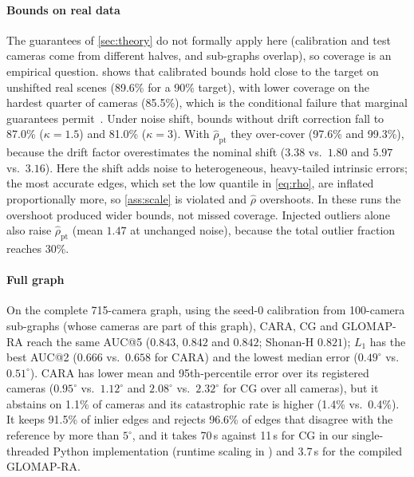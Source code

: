 

\paragraph*{Bounds on real data} The guarantees of \cref{sec:theory} do not formally apply here (calibration and test cameras come from different halves, and sub-graphs overlap), so coverage is an empirical question.  shows that calibrated bounds hold close to the target on unshifted real scenes (89.6\% for a 90\% target), with lower coverage on the hardest quarter of cameras (85.5\%), which is the conditional failure that marginal guarantees permit~\cite{pathak2026adaptive}. Under noise shift, bounds without drift correction fall to 87.0\% ($\kappa=1.5$) and 81.0\% ($\kappa=3$). With $\hat\rho_{\mathrm{pt}}$ they over-cover (97.6\% and 99.3\%), because the drift factor overestimates the nominal shift ($3.38$ vs.\ $1.80$ and $5.97$ vs.\ $3.16$). Here the shift adds noise to heterogeneous, heavy-tailed intrinsic errors; the most accurate edges, which set the low quantile in \eqref{eq:rho}, are inflated proportionally more, so \cref{ass:scale} is violated and $\hat\rho$ overshoots. In these runs the overshoot produced wider bounds, not missed coverage. Injected outliers alone also raise $\hat\rho_{\mathrm{pt}}$ (mean $1.47$ at unchanged noise), because the total outlier fraction reaches 30\%.

\paragraph*{Full graph} On the complete 715-camera graph, using the seed-0 calibration from 100-camera sub-graphs (whose cameras are part of this graph), CARA, CG and GLOMAP-RA reach the same AUC@5 ($0.843$, $0.842$ and $0.842$; Shonan-H $0.821$); $L_1$ has the best AUC@2 ($0.666$ vs.\ $0.658$ for CARA) and the lowest median error ($0.49^\circ$ vs.\ $0.51^\circ$). CARA has lower mean and 95th-percentile error over its registered cameras ($0.95^\circ$ vs.\ $1.12^\circ$ and $2.08^\circ$ vs.\ $2.32^\circ$ for CG over all cameras), but it abstains on 1.1\% of cameras and its catastrophic rate is higher (1.4\% vs.\ 0.4\%). It keeps 91.5\% of inlier edges and rejects 96.6\% of edges that disagree with the reference by more than $5^\circ$, and it takes 70\,s against 11\,s for CG in our single-threaded Python implementation (runtime scaling in ) and 3.7\,s for the compiled GLOMAP-RA.




